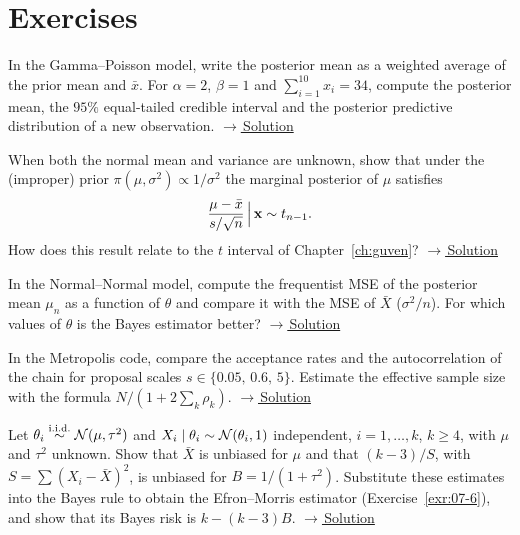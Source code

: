 \documentclass[main.tex]{subfiles}
\begin{document}
\section{Exercises}

\begin{exercise}\label{exr:19-1}
In the Gamma--Poisson model, write the posterior mean as a weighted average of the prior mean and $\bar x$. For $\alpha=2$, $\beta=1$ and $\sum_{i=1}^{10}x_i=34$, compute the posterior mean, the $95\%$ equal-tailed credible interval and the posterior predictive distribution of a new observation.
\hfill\hyperref[coz:19-1]{\footnotesize$\rightarrow$\,Solution}
\end{exercise}

\begin{exercise}\label{exr:19-2}
When both the normal mean and variance are unknown, show that under the (improper) prior $\pi(\mu,\sigma^2)\propto1/\sigma^2$ the marginal posterior of $\mu$ satisfies
\[
\frac{\mu-\bar x}{s/\sqrt n}\,\Big|\,\mathbf{x}\sim t_{n-1} .
\]
How does this result relate to the $t$ interval of Chapter~\ref{ch:guven}?
\hfill\hyperref[coz:19-2]{\footnotesize$\rightarrow$\,Solution}
\end{exercise}

\begin{exercise}\label{exr:19-3}
In the Normal--Normal model, compute the frequentist MSE of the posterior mean $\mu_n$ as a function of $\theta$ and compare it with the MSE of $\bar X$ ($\sigma^2/n$). For which values of $\theta$ is the Bayes estimator better?
\hfill\hyperref[coz:19-3]{\footnotesize$\rightarrow$\,Solution}
\end{exercise}

\begin{exercise}\label{exr:19-4}
In the Metropolis code, compare the acceptance rates and the autocorrelation of the chain for proposal scales $s\in\{0.05,\,0.6,\,5\}$. Estimate the effective sample size with the formula $N/(1+2\sum_k\rho_k)$.
\hfill\hyperref[coz:19-4]{\footnotesize$\rightarrow$\,Solution}
\end{exercise}

\begin{exercise}\label{exr:19-5}
Let $\theta_i\overset{\text{i.i.d.}}{\sim}\mathcal{N}(\mu,\tau^2)$ and $X_i\mid\theta_i\sim\mathcal{N}(\theta_i,1)$ independent, $i=1,\dots,k$, $k\ge4$, with $\mu$ and $\tau^2$ unknown. Show that $\bar X$ is unbiased for $\mu$ and that $(k-3)/S$, with $S=\sum(X_i-\bar X)^2$, is unbiased for $B=1/(1+\tau^2)$. Substitute these estimates into the Bayes rule to obtain the Efron--Morris estimator (Exercise~\ref{exr:07-6}), and show that its Bayes risk is $k-(k-3)B$.
\hfill\hyperref[coz:19-5]{\footnotesize$\rightarrow$\,Solution}
\end{exercise}
\end{document}
